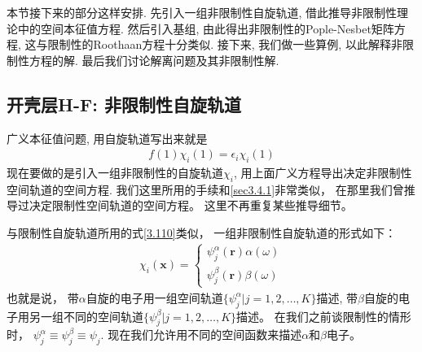本节接下来的部分这样安排. 
先引入一组非限制性自旋轨道, 
借此推导非限制性\hft 理论中的空间本征值方程. 
然后引入基组, 
由此得出非限制性的Pople-Nesbet矩阵方程, 
这与限制性的Roothaan方程十分类似. 
接下来, 
我们做一些算例, 
以此解释非限制性方程的解. 
最后我们讨论解离问题及其非限制性解.

\subsection{开壳层H-F: 非限制性自旋轨道}
广义\hft 本征值问题, 
用自旋轨道写出来就是
\begin{align}\label{3.308}
	f(1)\chi_i(1) = \epsilon_i \chi_i(1)
\end{align}
现在要做的是引入一组非限制性的自旋轨道$\chi_i$, 
用上面广义\hft 方程导出决定非限制性空间轨道的空间方程. 
我们这里所用的手续和\ref{sec3.4.1}非常类似，
在那里我们曾推导过决定限制性空间轨道的空间方程。
这里不再重复某些推导细节。


与限制性自旋轨道所用的式\eqref{3.110}类似，
一组非限制性自旋轨道的形式如下：
\begin{align}\label{3.309}
	\chi_i(\mathbf{x}) =
	\begin{cases*}
		\psi_j^\alpha(\mathbf{r})\alpha(\omega)\\
		\psi_j^\beta (\mathbf{r})\beta(\omega)
	\end{cases*}
\end{align}
也就是说，
带$\alpha$自旋的电子用一组空间轨道$\{\psi_j^\alpha |j=1,2,\ldots,K \}$描述, 
带$\beta$自旋的电子用另一组不同的空间轨道$\{\psi_j^\beta |j=1,2,\ldots,K \}$描述。
在我们之前谈限制性的情形时，
$\psi_j^\alpha \equiv \psi_j^\beta \equiv \psi_j$. 
现在我们允许用不同的空间函数来描述$\alpha$和$\beta$电子。


